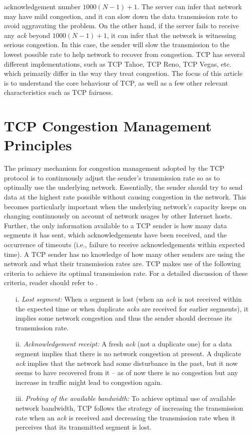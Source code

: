 \begin{multicols}{2}
acknowledgement number $1000(N-1) + 1$. The server can infer that network may have mild congestion, and it can slow down the data transmission rate to avoid aggravating the problem. On the other hand, if the server fails to receive any \textit{ack} beyond $1000(N-1) + 1$, it can infer that the network is witnessing serious congestion. In this case, the sender will slow the transmission to the lowest possible rate to help network to recover from congestion. TCP has several different implementations, such as TCP Tahoe, TCP Reno, TCP Vegas, etc. which primarily differ in the way they treat congestion. The focus of this article is to understand the core behaviour of TCP, as well as a few other relevant characteristics such as TCP fairness. 

\section{TCP Congestion Management Principles}

The primary mechanism for congestion management adopted by the TCP protocol is to continuously adjust the sender’s transmission rate so as to optimally use the underlying network. Essentially, the sender should try to send data at the highest rate possible without causing congestion in the network. This becomes particularly important when the underlying network’s capacity keeps on changing continuously on account of network usages by other Internet hosts. Further, the only information available to a TCP sender is how many data segments it has sent, which acknowledgements have been received, and the occurrence of timeouts (i.e., failure to receive acknowledgements within expected time). A TCP sender has no knowledge of how many other senders are using the network and what their transmission rates are. TCP makes use of the following criteria to achieve its optimal transmission rate. For a detailed discussion of these criteria, reader should refer to  \cite{art2-key03}.
\begin{itemize}

\itemsep=.2cm

\item[i.] \textit{Lost segment:} When a segment is lost (when an \textit{ack} is not received within the expected time or when duplicate \textit{acks} are received for earlier segments), it implies some network congestion and thus the sender should decrease its transmission rate.
\item[ii.] \textit{Acknowledgement receipt:} A fresh \textit{ack} (not a duplicate one) for a data segment implies that there is no network congestion at present. A duplicate \textit{ack} implies that the network had some disturbance in the past, but it now seems to have recovered from it – as of now there is no congestion but any increase in traffic might lead to congestion again.
\item[iii.] \textit{Probing of the available bandwidth:} To achieve optimal use of available network bandwidth, TCP follows the strategy of increasing the transmission rate when an \textit{ack} is received and decreasing the transmission rate when it perceives that its transmitted segment is lost.
\end{itemize}


\end{multicols}
